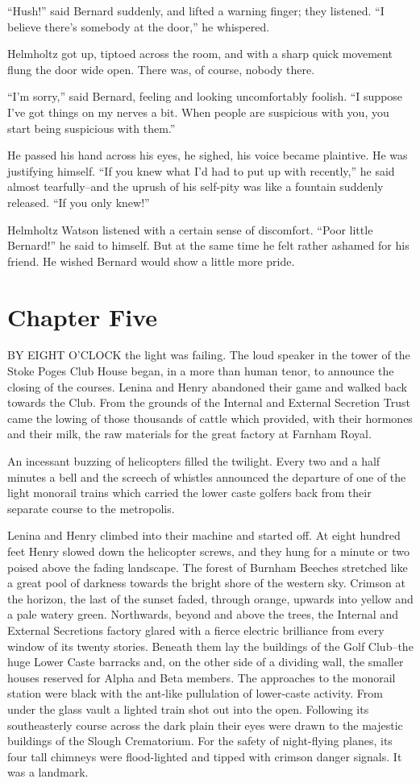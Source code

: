\documentclass[12pt]{report}
\newcommand{\mychapter}[2]{
\setcounter{chapter}{#1}
    \setcounter{section}{0}
    \chapter*{#2}
    \addcontentsline{toc}{chapter}{#2}
}
\begin{document}
``Hush!'' said Bernard suddenly, and lifted a warning finger; they
listened. ``I believe there's somebody at the door,'' he whispered.

Helmholtz got up, tiptoed across the room, and with a sharp quick
movement flung the door wide open. There was, of course, nobody there.

``I'm sorry,'' said Bernard, feeling and looking uncomfortably foolish.
``I suppose I've got things on my nerves a bit. When people are
suspicious with you, you start being suspicious with them.''

He passed his hand across his eyes, he sighed, his voice became
plaintive. He was justifying himself. ``If you knew what I'd had to put
up with recently,'' he said almost tearfully--and the uprush of his
self-pity was like a fountain suddenly released. ``If you only knew!''

Helmholtz Watson listened with a certain sense of discomfort. ``Poor
little Bernard!'' he said to himself. But at the same time he felt
rather ashamed for his friend. He wished Bernard would show a little
more pride.

\mychapter{5}{Chapter Five}
BY EIGHT O'CLOCK the light was failing. The loud speaker in the tower of
the Stoke Poges Club House began, in a more than human tenor, to
announce the closing of the courses. Lenina and Henry abandoned their
game and walked back towards the Club. From the grounds of the Internal
and External Secretion Trust came the lowing of those thousands of
cattle which provided, with their hormones and their milk, the raw
materials for the great factory at Farnham Royal.

An incessant buzzing of helicopters filled the twilight. Every two and a
half minutes a bell and the screech of whistles announced the departure
of one of the light monorail trains which carried the lower caste
golfers back from their separate course to the metropolis.

Lenina and Henry climbed into their machine and started off. At eight
hundred feet Henry slowed down the helicopter screws, and they hung for
a minute or two poised above the fading landscape. The forest of Burnham
Beeches stretched like a great pool of darkness towards the bright shore
of the western sky. Crimson at the horizon, the last of the sunset
faded, through orange, upwards into yellow and a pale watery green.
Northwards, beyond and above the trees, the Internal and External
Secretions factory glared with a fierce electric brilliance from every
window of its twenty stories. Beneath them lay the buildings of the Golf
Club--the huge Lower Caste barracks and, on the other side of a dividing
wall, the smaller houses reserved for Alpha and Beta members. The
approaches to the monorail station were black with the ant-like
pullulation of lower-caste activity. From under the glass vault a
lighted train shot out into the open. Following its southeasterly course
across the dark plain their eyes were drawn to the majestic buildings of
the Slough Crematorium. For the safety of night-flying planes, its four
tall chimneys were flood-lighted and tipped with crimson danger signals.
It was a landmark.
\end{document}
